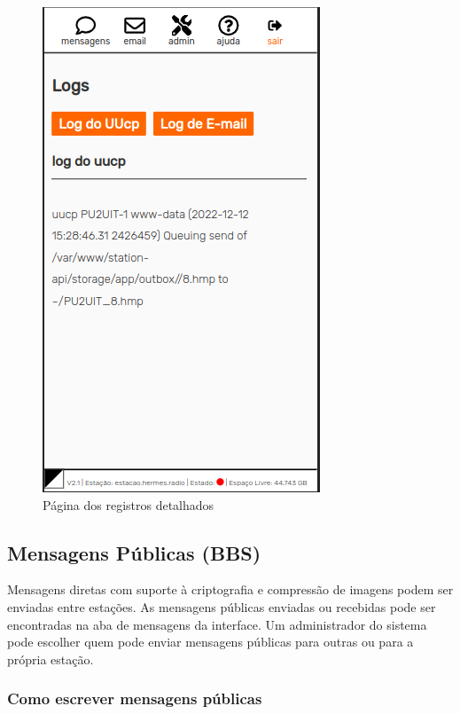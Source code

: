 \documentclass[11pt,a4paper]{article}
\begin{document}
    \begin{figure}[H]
    \centering
    \includegraphics[width=0.5\columnwidth]{screenshots/frontend/pt_kn/logs.png}
    \caption{Página dos registros detalhados}
    \label{fig:logs}
\end{figure}



\subsection{Mensagens Públicas  (BBS)}

Mensagens diretas com suporte à criptografia e compressão de imagens podem ser enviadas entre estações. As mensagens públicas enviadas ou recebidas pode ser encontradas na aba de mensagens da interface. Um administrador do sistema pode escolher quem pode enviar mensagens públicas para outras ou para a própria estação.

\subsubsection{Como escrever mensagens públicas}
\end{document}
